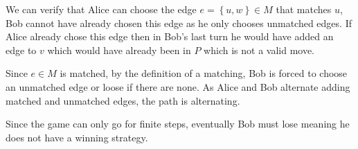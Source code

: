 \documentclass[a4paper, 11pt]{article}
\def\set#1{\left\{ #1 \right\}}
\begin{document}
\begin{multicols*}{2}
\begin{itemize}
		      We can verify that Alice can choose the edge $e=\set{u,w}\in M$ that matches $u$, Bob cannot have already chosen this edge as he only chooses unmatched edges. If Alice already chose this edge then in Bob's last turn  he would have added an edge to $v$ which would have already been in $P$ which is not a valid move.

		      Since $e\in M$ is matched, by the definition of a matching, Bob is forced to choose an unmatched edge or loose if there are none. As Alice and Bob alternate adding matched and unmatched edges, the path is alternating.
	\end{itemize}
	Since the game can only go for finite steps, eventually Bob must lose meaning he does not have a winning strategy.

	\vfill
	\pagebreak
\end{multicols*}
\end{document}

